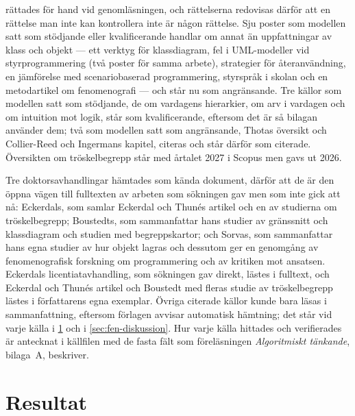  rättades för hand vid genomläsningen, och
rättelserna redovisas därför att en rättelse man inte kan kontrollera
inte är någon rättelse.  Sju poster som modellen satt som stödjande
eller kvalificerande handlar om annat än uppfattningar av klass och
objekt --- ett verktyg för klassdiagram, fel i UML-modeller vid
styrprogrammering (två poster för samma arbete), strategier för
återanvändning, en jämförelse med scenariobaserad programmering,
styrspråk i skolan och en metodartikel om fenomenografi --- och står nu
som angränsande.  Tre källor som modellen satt som stödjande, de om
vardagens hierarkier, om arv i vardagen och om intuition mot logik, står
som kvalificerande, eftersom det är så bilagan använder dem; två som
modellen satt som angränsande, Thotas översikt och Collier-Reed och
Ingermans kapitel, citeras och står därför som citerade.  Översikten om
tröskelbegrepp står med årtalet 2027 i Scopus men gavs ut 2026.

Tre doktorsavhandlingar hämtades som kända dokument, därför att de är den
öppna vägen till fulltexten av arbeten som sökningen gav men som inte
gick att nå: Eckerdals\autocite{Eckerdal2009PhD}, som samlar Eckerdal och
Thunés artikel och en av studierna om tröskelbegrepp; Boustedts\autocite{%
Boustedt2010PhD}, som sammanfattar hans studier av gränssnitt och
klassdiagram och studien med begreppskartor; och Sorvas\autocite{%
Sorva2012VPS}, som sammanfattar hans egna studier av hur objekt lagras och
dessutom ger en genomgång av fenomenografisk forskning om programmering
och av kritiken mot ansatsen.  Eckerdals licentiatavhandling, som
sökningen gav direkt, lästes i fulltext\autocite{Eckerdal2006Lic}, och
Eckerdal och Thunés artikel och Boustedt med fleras studie av
tröskelbegrepp lästes i författarens egna exemplar.  Övriga citerade källor
kunde bara läsas i sammanfattning, eftersom förlagen avvisar automatisk
hämtning; det står vid varje källa i \cref{sec:fen-resultat} och i
\cref{sec:fen-diskussion}.  Hur varje källa hittades och verifierades är
antecknat i källfilen med de fasta fält som föreläsningen
\emph{Algoritmiskt tänkande}, bilaga~A, beskriver.

\section{Resultat}
\label{sec:fen-resultat}

